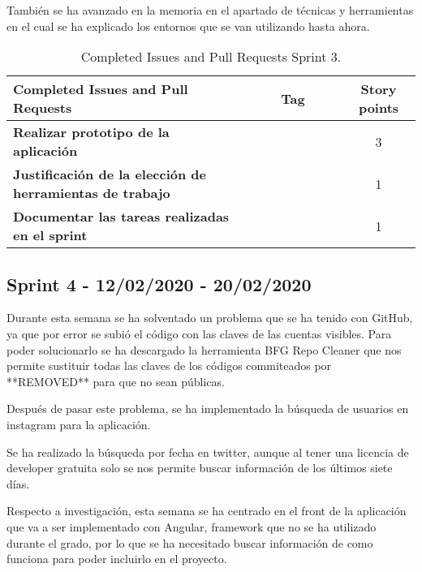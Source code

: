 También se ha avanzado en la memoria en el apartado de técnicas y herramientas en el cual se ha explicado los entornos que se van utilizando hasta ahora.


\begin{table}[ht!]
    \centering
    \resizebox{15cm}{!} {
    \begin{tabular}{|l|c|c|}
    \hline
    \rowcolor[rgb]{0.81,0.81,0.77}
    \textbf{Completed Issues and Pull Requests}     &\textbf{Tag}     & \textbf{Story points} \\ \hline
    \textbf{Realizar prototipo de la aplicación}         &\cellcolor[rgb]{0.0,0.33,0.71}\textcolor{white}{documentation}      &3 \\ \hline 
    \textbf{Justificación de la elección de herramientas de trabajo}         &\cellcolor[rgb]{0.0,0.33,0.71}\textcolor{white}{documentation}      &1 \\ \hline 
    \textbf{Documentar las tareas realizadas en el sprint}         &\cellcolor[rgb]{0.0,0.33,0.71}\textcolor{white}{documentation}      &1 \\ \hline 
    \end{tabular}}
    \caption{Completed Issues and Pull Requests Sprint 3.}
    \label{tab:my_label}
\end{table}


\subsection{Sprint 4 - 12/02/2020 - 20/02/2020}
Durante esta semana se ha solventado un problema que se ha tenido con GitHub, ya que por error se subió el código con las claves de las cuentas visibles. Para poder solucionarlo se ha descargado la herramienta BFG Repo Cleaner que nos permite sustituir todas las claves de los códigos commiteados por **REMOVED** para que no sean públicas.

Después de pasar este problema, se ha implementado la búsqueda de usuarios en instagram para la aplicación.

Se ha realizado la búsqueda por fecha en twitter, aunque al tener una licencia de developer gratuita solo se nos permite buscar información de los últimos siete días.

Respecto a investigación, esta semana se ha centrado en el front de la aplicación que va a ser implementado con Angular, framework que no se ha utilizado durante el grado, por lo que se ha necesitado buscar información de como funciona para poder incluirlo en el proyecto.

